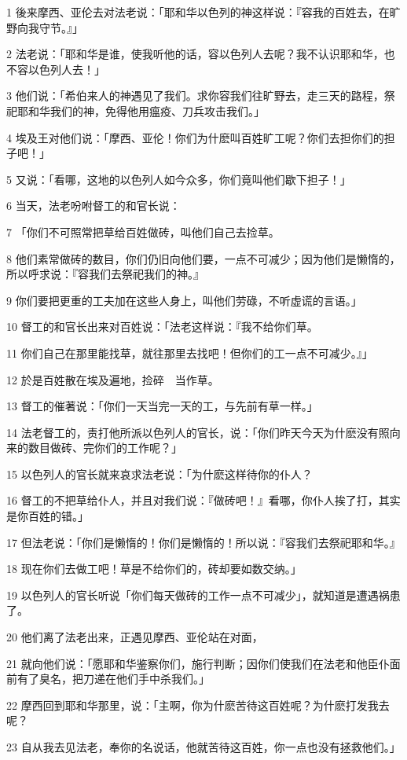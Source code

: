 \par 1 後来摩西、亚伦去对法老说：「耶和华以色列的神这样说：『容我的百姓去，在旷野向我守节。』」
\par 2 法老说：「耶和华是谁，使我听他的话，容以色列人去呢？我不认识耶和华，也不容以色列人去！」
\par 3 他们说：「希伯来人的神遇见了我们。求你容我们往旷野去，走三天的路程，祭祀耶和华我们的神，免得他用瘟疫、刀兵攻击我们。」
\par 4 埃及王对他们说：「摩西、亚伦！你们为什麽叫百姓旷工呢？你们去担你们的担子吧！」
\par 5 又说：「看哪，这地的以色列人如今众多，你们竟叫他们歇下担子！」
\par 6 当天，法老吩咐督工的和官长说：
\par 7 「你们不可照常把草给百姓做砖，叫他们自己去捡草。
\par 8 他们素常做砖的数目，你们仍旧向他们要，一点不可减少；因为他们是懒惰的，所以呼求说：『容我们去祭祀我们的神。』
\par 9 你们要把更重的工夫加在这些人身上，叫他们劳碌，不听虚谎的言语。」
\par 10 督工的和官长出来对百姓说：「法老这样说：『我不给你们草。
\par 11 你们自己在那里能找草，就往那里去找吧！但你们的工一点不可减少。』」
\par 12 於是百姓散在埃及遍地，捡碎　当作草。
\par 13 督工的催著说：「你们一天当完一天的工，与先前有草一样。」
\par 14 法老督工的，责打他所派以色列人的官长，说：「你们昨天今天为什麽没有照向来的数目做砖、完你们的工作呢？」
\par 15 以色列人的官长就来哀求法老说：「为什麽这样待你的仆人？
\par 16 督工的不把草给仆人，并且对我们说：『做砖吧！』看哪，你仆人挨了打，其实是你百姓的错。」
\par 17 但法老说：「你们是懒惰的！你们是懒惰的！所以说：『容我们去祭祀耶和华。』
\par 18 现在你们去做工吧！草是不给你们的，砖却要如数交纳。」
\par 19 以色列人的官长听说「你们每天做砖的工作一点不可减少」，就知道是遭遇祸患了。
\par 20 他们离了法老出来，正遇见摩西、亚伦站在对面，
\par 21 就向他们说：「愿耶和华鉴察你们，施行判断；因你们使我们在法老和他臣仆面前有了臭名，把刀递在他们手中杀我们。」
\par 22 摩西回到耶和华那里，说：「主啊，你为什麽苦待这百姓呢？为什麽打发我去呢？
\par 23 自从我去见法老，奉你的名说话，他就苦待这百姓，你一点也没有拯救他们。」

